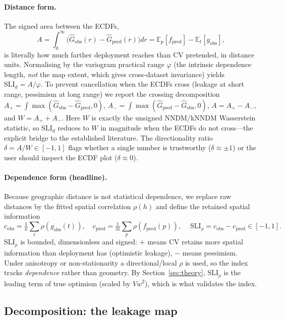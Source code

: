 \documentclass[11pt,a4paper]{article}
\newcommand{\SLI}{\mathrm{SLI}}
\newcommand{\SLIrho}{\SLI_{\rho}}
\newcommand{\SLId}{\SLI_{d}}
\newcommand{\E}{\mathbb{E}}
\newcommand{\Gobs}{\widehat{G}_{\mathrm{obs}}}
\newcommand{\Gpred}{\widehat{G}_{\mathrm{pred}}}
\begin{document}
\paragraph{Distance form.} The signed area between the ECDFs,
\begin{equation}
A=\int_0^\infty\!\bigl(\Gobs(r)-\Gpred(r)\bigr)dr
 = \E_p[f_{\text{pred}}]-\E_t[g_{\text{obs}}],
\end{equation}
is literally how much farther deployment reaches than CV pretended, in distance
units. Normalising by the variogram practical range $\varphi$ (the intrinsic
dependence length, \emph{not} the map extent, which gives cross-dataset invariance)
yields $\SLId=A/\varphi$. To prevent cancellation when the ECDFs cross (leakage at
short range, pessimism at long range) we report the crossing decomposition
$A_+=\int\max(\Gobs-\Gpred,0)$, $A_-=\int\max(\Gpred-\Gobs,0)$, $A=A_+-A_-$, and
$W=A_++A_-$. Here $W$ is exactly the unsigned NNDM/kNNDM Wasserstein statistic, so
$\SLId$ reduces to $W$ in magnitude when the ECDFs do not cross---the explicit
bridge to the established literature. The directionality ratio
$\delta=A/W\in[-1,1]$ flags whether a single number is trustworthy ($\delta\approx
\pm 1$) or the user should inspect the ECDF plot ($\delta\approx 0$).

\paragraph{Dependence form (headline).} Because geographic distance is not
statistical dependence, we replace raw distances by the fitted spatial correlation
$\rho(h)$ and define the retained spatial information
\begin{equation}
c_{\text{obs}}=\tfrac1n\textstyle\sum_t\rho(g_{\text{obs}}(t)),\quad
c_{\text{pred}}=\tfrac1m\textstyle\sum_p\rho(f_{\text{pred}}(p)),\quad
\boxed{\ \SLIrho=c_{\text{obs}}-c_{\text{pred}}\in[-1,1].\ }
\end{equation}
$\SLIrho$ is bounded, dimensionless and signed: $+$ means CV retains more spatial
information than deployment has (optimistic leakage), $-$ means pessimism. Under
anisotropy or non-stationarity a directional/local $\rho$ is used, so the index
tracks \emph{dependence} rather than geometry. By
Section~\ref{sec:theory}, $\SLIrho$ is the leading term of true optimism
(scaled by $Vw^2$), which is what validates the index.

\subsection{Decomposition: the leakage map}
\end{document}
